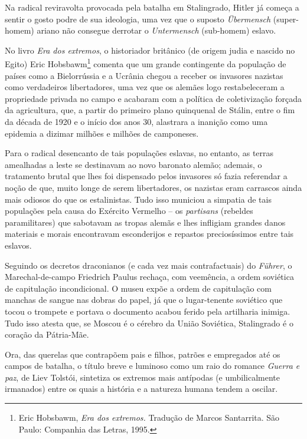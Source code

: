 Na radical reviravolta provocada pela batalha em Stalingrado, Hitler já
começa a sentir o gosto podre de sua ideologia, uma vez que o suposto
\emph{Übermensch} (super-homem) ariano não consegue derrotar o
\emph{Untermensch} (sub-homem) eslavo.

No livro \emph{Era dos extremos}, o historiador britânico (de origem
judia e nascido no Egito) Eric Hobsbawm\footnote{Eric Hobsbawm,
  \emph{Era dos extremos.} Tradução de Marcos Santarrita. São Paulo:
  Companhia das Letras, 1995.} comenta que um grande contingente da
população de países como a Bielorrússia e a Ucrânia chegou a receber os
invasores nazistas como verdadeiros libertadores, uma vez que os alemães
logo restabeleceram a propriedade privada no campo e acabaram com a
política de coletivização forçada da agricultura, que, a partir do
primeiro plano quinquenal de Stálin, entre o fim da década de 1920 e o
início dos anos 30, alastrara a inanição como uma epidemia a dizimar
milhões e milhões de camponeses.

Para o radical desencanto de tais populações eslavas, no entanto, as
terras amealhadas a leste se destinavam ao novo baronato alemão;
ademais, o tratamento brutal que lhes foi dispensado pelos invasores só
fazia referendar a noção de que, muito longe de serem libertadores, os
nazistas eram carrascos ainda mais odiosos do que os estalinistas. Tudo
isso municiou a simpatia de tais populações pela causa do Exército
Vermelho -- os \emph{partisans} (rebeldes paramilitares) que sabotavam
as tropas alemãs e lhes infligiam grandes danos materiais e morais
encontravam esconderijos e repastos preciosíssimos entre tais eslavos.

Seguindo os decretos draconianos (e cada vez mais contrafactuais) do
\emph{Führer}, o Marechal-de-campo Friedrich Paulus rechaça, com
veemência, a ordem soviética de capitulação incondicional. O museu expõe
a ordem de capitulação com manchas de sangue nas dobras do papel, já que
o lugar-tenente soviético que tocou o trompete e portava o documento
acabou ferido pela artilharia inimiga. Tudo isso atesta que, se Moscou é
o cérebro da União Soviética, Stalingrado é o coração da Pátria-Mãe.

Ora, das querelas que contrapõem pais e filhos, patrões e empregados até
os campos de batalha, o título breve e luminoso como um raio do romance
\emph{Guerra e paz}, de Liev Tolstói, sintetiza os extremos mais
antípodas (e umbilicalmente irmanados) entre os quais a história e a
natureza humana tendem a oscilar.

